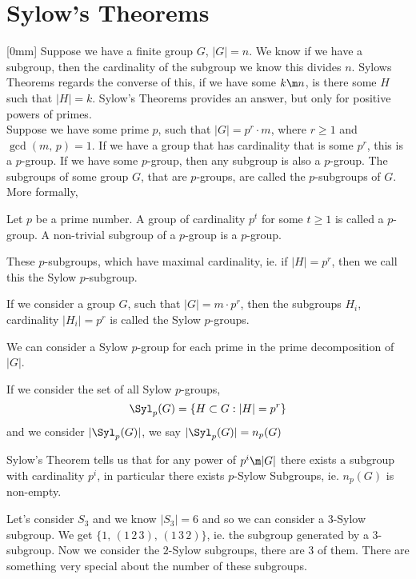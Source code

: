 
\section{Sylow's Theorems}[0mm]
Suppose we have a finite group $G$, $|G| = n$. We know if we have a subgroup, then the cardinality of the subgroup we know this divides $n$. Sylows Theorems regards the converse of this, if we have some $k \m n$, is there some $H$ such that $|H| = k$. Sylow's Theorems provides an answer, but only for positive powers of primes. \\

Suppose we have some prime $p$, such that $|G| = p^r \cdot m$, where $r \ge 1$ and $\gcd(m,\, p) = 1$. If we have a group that has cardinality that is some $p^r$, this is a $p$-group. If we have some $p$-group, then any subgroup is also a $p$-group. The subgroups of some group $G$, that are $p$-groups, are called the $p$-subgroups of $G$. More formally,
\begin{ndefi}[$p$-group]
  Let $p$ be a prime number. A group of cardinality $p^t$ for some $t \ge 1$ is called a $p$-group. A non-trivial subgroup of a $p$-group is a $p$-group.
\end{ndefi}

These $p$-subgroups, which have maximal cardinality, ie. if $|H| = p^r$, then we call this the Sylow $p$-subgroup.
\begin{ndefi}
  If we consider a group $G$, such that $|G| = m \cdot p^r$, then the subgroups $H_i$, cardinality $|H_i| = p^r$ is called the Sylow $p$-groups.
\end{ndefi}
\begin{remark}
   We can consider a Sylow $p$-group for each prime in the prime decomposition of $|G|$.
\end{remark}

If we consider the set of all Sylow $p$-groups,
$$ \Syl_p(G) = \{H \subset G : |H| = p ^ r\} $$
and we consider $|\Syl_p(G)|$, we say $|\Syl_p(G)| = n_p(G)$

Sylow's Theorem tells us that for any power of $p^i \m |G|$ there exists a subgroup with cardinality $p^i$, in particular there exists $p$-Sylow Subgroups, ie. $n_p(G)$ is non-empty.

\begin{eg}
  Let's consider $S_3$ and we know $|S_3| = 6$ and so we can consider a $3$-Sylow subgroup. We get $\{1,\,(1\,2\,3),\,(1\,3\,2) \}$, ie. the subgroup generated by a $3$-subgroup. Now we consider the $2$-Sylow subgroups, there are $3$ of them. There are something very special about the number of these subgroups.
\end{eg}

